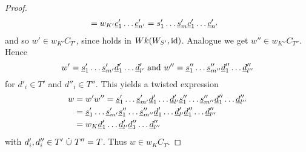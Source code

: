 \begin{theo}
\begin{proof}
\begin{align*}
				& = w_{K'} \underline{c}'_1 \ldots \underline{c}'_{n'} = s'_1 \ldots \underline{s}'_m \underline{c}'_1 \ldots \underline{c}'_{n'}
		\end{align*}
		and so $w' \in w_{K'}C_{T'}$, since  holds in $Wk(W_{S'},\operatorname{id})$. Analogue we get $w'' \in w_{K''}C_{T''}$. Hence
		$$ w' = \underline{s}'_1 \ldots \underline{s}'_{m'} \underline{d}'_1 \ldots \underline{d}'_{l'} \textrm{ and } w'' = \underline{s}''_1 \ldots \underline{s}''_{m''} \underline{d}''_1 \ldots \underline{d}''_{l''} $$
		for $d'_i \in T'$ and $d''_i \in T''$. This yields a twisted expression
		\begin{align*}
			w	& = w' w'' = \underline{s}'_1 \ldots \underline{s}'_{m'} \underline{d}'_1 \ldots \underline{d}'_{l'} \underline{s}''_1 \ldots \underline{s}''_{m''} \underline{d}''_1 \ldots \underline{d}''_{l''} \\
				& = \underline{s}'_1 \ldots \underline{s}'_{m'} \underline{s}''_1 \ldots \underline{s}''_{m''} \underline{d}'_1 \ldots \underline{d}'_{l'} \underline{d}''_1 \ldots \underline{d}''_{l''} \\
				& = w_K \underline{d}'_1 \ldots \underline{d}'_{l'} \underline{d}''_1 \ldots \underline{d}''_{l''}
		\end{align*}
		with $d'_i,d''_i \in T' \ \dot \cup \  T'' = T$. Thus $w \in w_KC_T$.
	\end{proof}
\end{theo}